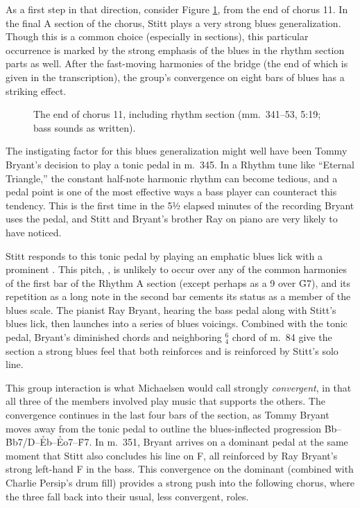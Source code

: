 As a first step in that direction, consider Figure \ref{et:rhythm-sect-11},
from the end of chorus 11. In the final A section of the chorus, Stitt plays a
very strong blues generalization. Though this is a common choice (especially
in  sections), this particular occurrence is marked by the strong
emphasis of the blues in the rhythm section parts as well. After the
fast-moving harmonies of the bridge (the end of which is given in the
transcription), the group's convergence on eight bars of blues has a striking
effect.

\begin{figure}[tbp]
  \caption[The end of chorus 11, including rhythm section.]{%
    The end of chorus 11, including rhythm section (mm.~341--53, 5:19; bass
    sounds as written).}
  \label{et:rhythm-sect-11}
\end{figure}

The instigating factor for this blues generalization might well have been
Tommy Bryant's decision to play a tonic pedal in m.~345. In a Rhythm tune like
``Eternal Triangle,'' the constant half-note harmonic rhythm can become
tedious, and a pedal point is one of the most effective ways a bass player can
counteract this tendency. This is the first time in the 5½ elapsed minutes of the
recording Bryant uses the pedal, and Stitt and Bryant's brother Ray on piano
are very likely to have noticed.

Stitt responds to this tonic pedal by playing an emphatic blues lick with a
prominent \Aflat. This pitch, \flat{}, is unlikely to occur over
any of the common harmonies of the first bar of the Rhythm A section (except
perhaps as a \flat{}9 over \h{G7}), and its repetition as a long note in the
second bar cements its status as a member of the \Bflat blues scale. The
pianist Ray Bryant, hearing the bass pedal along with Stitt's blues lick, then
launches into a series of blues voicings. Combined with the tonic pedal,
Bryant's diminished chords and neighboring $^6_4$ chord of m.~84 give the
section a strong blues feel that both reinforces and is reinforced by Stitt's
solo line.

This group interaction is what Michaelsen would call strongly
\emph{convergent}, in that all three of the members involved play music that
supports the others. The convergence continues in the last four bars
of the section, as Tommy Bryant moves away from the tonic pedal to outline the
blues-inflected progression \h{Bb}--\h{Bb7/D}--\h{Eb}--\h{Eo7}--\h{F7}. In
m.~351, Bryant arrives on a dominant pedal at the same moment that Stitt also
concludes his line on F, all reinforced by Ray Bryant's strong left-hand F in
the bass. This convergence on the dominant (combined with Charlie
Persip's drum fill) provides a strong push into the following chorus, where
the three fall back into their usual, less convergent, roles.

